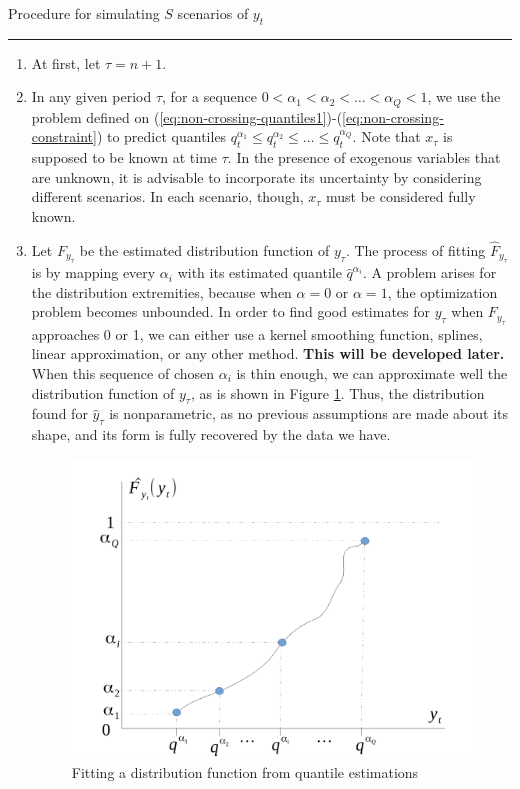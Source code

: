 Procedure for simulating $S$ scenarios of $y_t$

\noindent\rule{\textwidth}{1pt}

\begin{enumerate}
	
\item At first, let $\tau = n + 1$.

\item In any given period $\tau$, for a sequence $0 < \alpha_1 < \alpha_2 < \dots < \alpha_Q < 1$, we use the problem defined on  (\ref{eq:non-crossing-quantiles1})-(\ref{eq:non-crossing-constraint}) to predict quantiles 
 $q^{\alpha_1}_{t} \leq q^{\alpha_2}_{t} \leq \dots \leq q^{\alpha_Q}_{t}$.
Note that $x_{\tau}$ is supposed to be known at time $\tau$. In the presence of exogenous variables that are unknown, it is advisable to incorporate its uncertainty by considering different scenarios. In each scenario, though, $x_{\tau}$ must be considered fully known. 
 
\item Let $F_{y_{\tau}}$ be the estimated distribution function of ${y}_{\tau}$. 
The process of fitting $\hat{F}_{y_{\tau}}$ is by mapping every $\alpha_i$ with its estimated quantile $\hat{q}^{\alpha_i}$. A problem arises for the distribution extremities, because when $\alpha = 0$ or $\alpha = 1$, the optimization problem becomes unbounded.
In order to find good estimates for $y_{\tau}$ when $F_{y_{\tau}}$ approaches 0 or 1, we can either use a kernel smoothing function, splines, linear approximation, or any other method. 
\textbf{This will be developed later.}
When this sequence of chosen $\alpha_i$ is thin enough, we can approximate well the distribution function of $y_{\tau}$, as is shown in Figure \ref{fig:grafico-quantis}. 
Thus, the distribution found for $\hat{y}_{\tau}$ is nonparametric, as no previous assumptions are made about its shape, and its form is fully recovered by the data we have.

\begin{figure}[h]
\centering
\includegraphics[width=0.7\linewidth]{./Figuras/grafico-quantis}
\caption{Fitting a distribution function from quantile estimations}
\label{fig:grafico-quantis}
\end{figure}



\end{enumerate}
